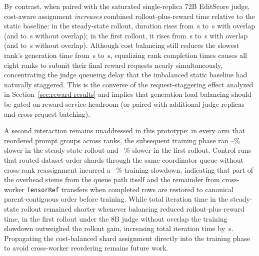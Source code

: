 By contrast, when paired with the saturated single-replica 72B EditScore judge, cost-aware assignment \emph{increases} combined rollout-plus-reward time relative to the static baseline: in the steady-state rollout, duration rises from \RFLargeBase{}\,s to \RFLargeSteal{}\,s with overlap (and to \RFLargeStealNoOverlap{}\,s without overlap); in the first rollout, it rises from \RFLargeFirstBase{}\,s to \RFLargeFirstSteal{}\,s with overlap (and to \RFLargeFirstStealNoOverlap{}\,s without overlap).
Although cost balancing still reduces the slowest rank's generation time from \RFLargeTail{}\,s to \RFLargeTailSteal{}\,s, equalizing rank completion times causes all eight ranks to submit their final reward requests nearly simultaneously, concentrating the judge queueing delay that the imbalanced static baseline had naturally staggered.
This is the converse of the request-staggering effect analyzed in Section~\ref{sec:reward-results} and implies that generation load balancing should be gated on reward-service headroom (or paired with additional judge replicas and cross-request batching).

A second interaction remains unaddressed in this prototype: in every arm that reordered prompt groups across ranks, the subsequent training phase ran \RFTrainSlowSteadyMin{}--\RFTrainSlowSteadyMax{}\% slower in the steady-state rollout and \RFTrainSlowFirstMin{}--\RFTrainSlowFirstMax{}\% slower in the first rollout.
Control runs that routed dataset-order shards through the same coordinator queue without cross-rank reassignment incurred a \RFTrainSlowOwnerMin{}--\RFTrainSlowOwnerMax{}\% training slowdown, indicating that part of the overhead stems from the queue path itself and the remainder from cross-worker \texttt{TensorRef} transfers when completed rows are restored to canonical parent-contiguous order before training.
While total iteration time in the steady-state rollout remained shorter whenever balancing reduced rollout-plus-reward time, in the first rollout under the 8B judge without overlap the training slowdown outweighed the rollout gain, increasing total iteration time by \RFSmallFirstStepSteal{}\,s.
Propagating the cost-balanced shard assignment directly into the training phase to avoid cross-worker reordering remains future work.
